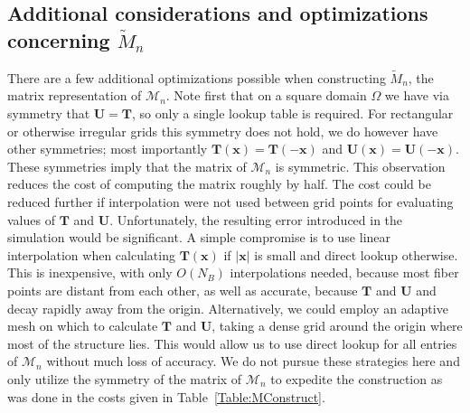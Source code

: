 \documentclass[preprint,12pt]{elsarticle}
\begin{document}
\subsection{Additional considerations and optimizations concerning $\tilde{M}_n$}
There are a few additional optimizations possible when constructing $\tilde{M}_n$, the matrix representation of $\mathcal{M}_n$.
Note first that on a square domain $\Omega$ we have via symmetry that $\mathbf{U}=\mathbf{T}$, so only a single lookup table is required.
For rectangular or otherwise irregular grids this symmetry does not hold, we do however have other symmetries; most importantly $\mathbf{T}(\mathbf{x}) = \mathbf{T}(-\mathbf{x})$ and $\mathbf{U}(\mathbf{x}) = \mathbf{U}(-\mathbf{x})$.
These symmetries imply that the matrix of $\mathcal{M}_n$ is symmetric. This observation reduces the cost of computing the matrix roughly by half. The cost could be reduced further if interpolation were not used between grid points for evaluating values of $\mathbf{T}$ and $\mathbf{U}$. Unfortunately, the resulting error introduced in the simulation would be significant. A simple compromise is to use linear interpolation when calculating $\mathbf{T}(\mathbf{x})$ if $|\mathbf{x}|$ is small and direct lookup otherwise. This is inexpensive, with only $O(N_B)$ interpolations needed, because most fiber points are distant from each other, as well as accurate, because $\mathbf{T}$ and $\mathbf{U}$ and decay rapidly away from the origin. 
Alternatively, we could employ an adaptive mesh on which to calculate $\mathbf{T}$ and $\mathbf{U}$, taking a dense grid around the origin where most of the structure lies. This would allow us to use direct lookup for all entries of $\mathcal{M}_n$ without much loss of accuracy. We do not pursue these strategies here and only utilize the symmetry of the matrix of $\mathcal{M}_n$ to expedite the construction as was done in the costs given in Table~\ref{Table:MConstruct}.
\end{document}
